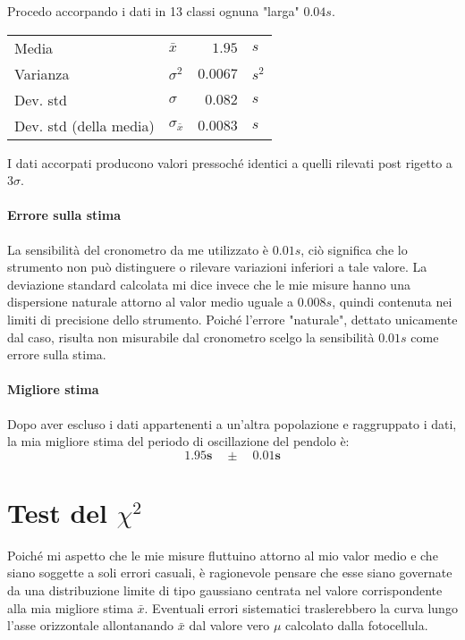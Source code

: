 \documentclass{article}
\begin{document}
	\noindent
	Procedo accorpando i dati in 13 classi ognuna "larga" $0.04s$.
	
	\vspace{0.8cm}
	\begin{table}[H]
		\centering
		\begin{tabular}{llrl}
			Media                       & $\bar{x}$             & $1.95$        & $s$       \\
			Varianza                    & $\sigma ^ 2$          & $0.0067$     & $s^2$  \\
			Dev. std                    & $\sigma$              & $0.082$      & $s$   \\
			Dev. std (della media)      & $\sigma_{\bar{x}}$    & $0.0083$     & $s$    
		\end{tabular}
	\end{table}
	\vspace{0.5cm}
	
	\noindent
	I dati accorpati producono valori pressoché identici a quelli rilevati post rigetto a $3\sigma$. \\
	
	
	\noindent
	\paragraph{Errore sulla stima} La sensibilità del cronometro da me utilizzato è $0.01s$, ciò significa che lo strumento non può distinguere o rilevare variazioni inferiori a tale valore. La deviazione standard calcolata mi dice invece che le mie misure hanno una dispersione naturale attorno al valor medio uguale a $0.008s$, quindi contenuta nei limiti di precisione dello strumento. Poiché l'errore "naturale", dettato unicamente dal caso, risulta non misurabile dal cronometro scelgo la sensibilità $0.01s$ come errore sulla stima.  \\
	
	\paragraph{Migliore stima} Dopo aver escluso i dati appartenenti a un'altra popolazione e raggruppato i dati, la mia migliore stima del  periodo di oscillazione del pendolo è:
	\[
	\mathbf{1.95s \quad \pm \quad 0.01 s}
	\]
	
	
	
	
	
	\newpage
	\section{Test del $\chi ^2$}
	Poiché mi aspetto che le mie misure fluttuino attorno al mio valor medio e che siano soggette a soli errori casuali, è ragionevole pensare che esse siano governate da una distribuzione limite di tipo gaussiano centrata nel valore corrispondente alla mia migliore stima $\bar{x}$. Eventuali errori sistematici traslerebbero la curva lungo l'asse orizzontale allontanando $\bar{x}$ dal valore vero $\mu$ calcolato dalla fotocellula. \\ 
	
\end{document}
